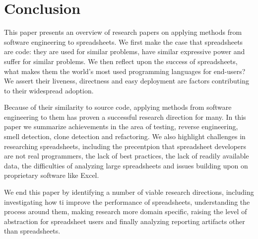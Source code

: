 \documentclass[conference]{IEEEtran}
\begin{document}
\balance

\section{Conclusion}
This paper presents an overview of research papers on applying methods from software engineering to spreadsheets. We first make the case that spreadsheets are code: they are used for similar problems, have similar expressive power and suffer for similar problems. We then reflect upon the success of spreadsheets, what makes them the world's most used programming languages for end-users? We assert their liveness, directness and easy deployment are factors contributing to their widespread adoption. 

Because of their similarity to source code, applying methods from software engineering to them has proven a successful research direction for many. In this paper we summarize achievements in the area of testing, reverse engineering, smell detection, clone detection and refactoring. We also highlight challenges in researching spreadsheets, including the precentpion that spreadsheet developers are not real programmers, the lack of best practices, the lack of readily available data, the difficulties of analyzing large spreadsheets and issues building upon on proprietary software like Excel.

We end this paper by identifying a number of viable research directions, including investigating how ti improve the performance of spreadsheets, understanding the process around them, making research more domain specific, raising the level of abstraction for spreadsheet users and finally analyzing reporting artifacts other than spreadsheets.

\balance









\end{document}
